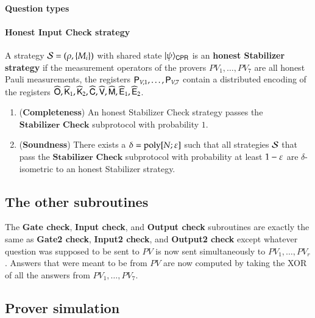 
\paragraph{Question types} 

\paragraph{Honest Input Check strategy}
A strategy $\mathcal{S} = (\rho,\{M_i\})$ with shared state $|\psi\rangle_{{\mathsf{C}} {\mathsf{P}} {\mathsf{R}}}$ is an \textbf{honest Stabilizer strategy} if the measurement operators of the provers $PV_1,\ldots,PV_7$ are all honest Pauli measurements, the registers ${\mathsf{P}}_{V,1},\ldots,{\mathsf{P}}_{V,7}$ contain a distributed encoding of the registers $\widehat{{\mathsf{O}}}, \widehat{{\mathsf{K}}}_1,\widehat{{\mathsf{K}}}_2, \widehat{{\mathsf{C}}}, \widehat{{\mathsf{V}}}, \widehat{{\mathsf{M}}}, \widehat{{\mathsf{E}}}_1, \widehat{{\mathsf{E}}}_2$.



\begin{lemma}	
\label{lem:stabilizer_check}
\leavevmode
\begin{enumerate}
	\item (\textbf{Completeness}) An honest Stabilizer Check strategy passes the $\textbf{Stabilizer Check}$ subprotocol with probability $1$. 
	\item (\textbf{Soundness}) There exists a $\delta = \operatorname{poly}[N;\varepsilon]$ such that all strategies $\mathcal{S}$ that pass the $\textbf{Stabilizer Check}$ subprotocol with probability at least $1 - \varepsilon$ are $\delta$-isometric to an honest Stabilizer strategy.
\end{enumerate}
\end{lemma}


\subsection{The other subroutines}
The \textbf{Gate check}, \textbf{Input check}, and \textbf{Output check} subroutines are exactly the same as \textbf{Gate2 check}, \textbf{Input2 check}, and \textbf{Output2 check} except whatever question was supposed to be sent to $PV$ is now sent simultaneously to $PV_1,\ldots,PV_r$. Answers that were meant to be from $PV$ are now computed by taking the XOR of all the answers from $PV_1,\ldots,PV_7$. 


\subsection{Prover simulation}

